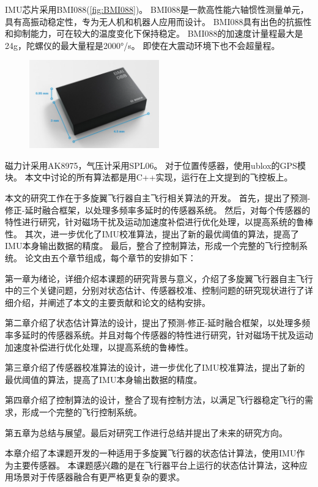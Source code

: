 \documentclass[
  type=master
]{gdutthesis}
\begin{document}
IMU芯片采用BMI088(\autoref{fig:BMI088})。
BMI088是一款高性能六轴惯性测量单元，具有高振动稳定性，专为无人机和机器人应用而设计。
BMI088具有出色的抗振性和抑制能力，可在较大的温度变化下保持稳定。
BMI088的加速度计量程最大是24g，陀螺仪的最大量程是2000°/s。
即使在大震动环境下也不会超量程。
\begin{figure}[H]
	\centering
	\includegraphics[width=0.5\textwidth]{屏幕截图 2022-03-30 151212.png}
	\label{fig:BMI088}
\end{figure}

磁力计采用AK8975，气压计采用SPL06。
对于位置传感器，使用ublox的GPS模块。
本文中讨论的所有算法都是用C++实现，运行在上文提到的飞控板上。

本文的研究工作在于多旋翼飞行器自主飞行相关算法的开发。
首先，提出了预测-修正-延时融合框架，以处理多频率多延时的传感器系统。
然后，对每个传感器的特性进行研究，针对磁场干扰及运动加速度补偿进行优化处理，以提高系统的鲁棒性。
其次，进一步优化了IMU校准算法，提出了新的最优阈值的算法，提高了IMU本身输出数据的精度。
最后，整合了控制算法，形成一个完整的飞行控制系统。
论文由五个章节组成，每个章节的安排如下：

第一章为绪论，详细介绍本课题的研究背景与意义，介绍了多旋翼飞行器自主飞行中的三个关键问题，分别对状态估计、传感器校准、控制问题的研究现状进行了详细介绍，并阐述了本文的主要贡献和论文的结构安排。

第二章介绍了状态估计算法的设计，提出了预测-修正-延时融合框架，以处理多频率多延时的传感器系统。并且对每个传感器的特性进行研究，针对磁场干扰及运动加速度补偿进行优化处理，以提高系统的鲁棒性。

第三章介绍了传感器校准算法的设计，进一步优化了IMU校准算法，提出了新的最优阈值的算法，提高了IMU本身输出数据的精度。

第四章介绍了控制算法的设计，整合了现有控制方法，以满足飞行器稳定飞行的需求，形成一个完整的飞行控制系统。

第五章为总结与展望。最后对研究工作进行总结并提出了未来的研究方向。

本章介绍了本课题开发的一种适用于多旋翼飞行器的状态估计算法，使用IMU作为主要传感器。
本课题感兴趣的是在飞行器平台上运行的状态估计算法，这种应用场景对于传感器融合有更严格更复杂的要求。
\end{document}
